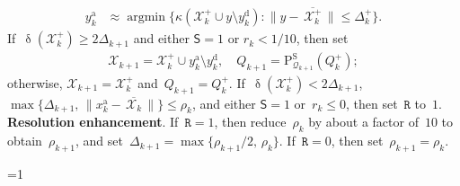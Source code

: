 \documentclass[11pt,a4paper,draft]{article}  %
\newcommand{\bibfile}{\jobname.bib}  %
\newcommand{\iscite}{0}  %
\theoremstyle{definition}
\numberwithin{equation}{section}
\newcommand{\mbar}[1]{\,\overline{\!{#1}\!}\,} %
\newcommand{\xopt}{\mbar}
\DeclareMathOperator{\xdist}{\updelta}
\DeclareMathOperator*{\argmin}{argmin}
\newcommand{\shortd}{\mathsf{S}}
\newcommand{\redrho}{\mathtt{R}}
\newcommand{\Int}{\mathcal{X}}
\newcommand{\Qua}{\mathcal{Q}}
\newcommand{\sss}[1]{{\scriptscriptstyle{#1}}}
\newcommand{\add}{{\textrm{a}}}
\newcommand{\drop}{{\textrm{d}}}
\newcommand{\new}{{\sss{+}}}
\newcommand{\sob}{{\scriptscriptstyle{\textrm{S}}}}
\newcommand{\Projs}{\mathrm{P}^\sob}
\begin{document}
\begin{algorithm}[htbp!]
\begin{algorithmic}[1]
\begin{align}
              \label{eq:yaddn}
              y_k^\add &\approx \argmin\{\kappa(\Int^{\new}_k \cup y \setminus y_k^\drop) \mathrel{:}
              \|y-\xopt{\Int^{\new}_k}\|\le \Delta^{\new}_k\}.
          \end{align}
        If~$\xdist(\Int^\new_k)\ge 2\Delta_{k+1}$ and either $\shortd = 1$ or $r_k < 1/10$, then set
          \begin{align}
            \label{eq:updateq2}
              \Int_{k+1} = \Int^{\new}_k\cup y_k^\add\setminus y_k^\drop,
              \quad
              Q_{k+1} = \Projs_{\Qua_{k+1}}(Q_k^\new) ;
          \end{align}
          otherwise, $\Int_{k+1} = \Int_k^\new$ and~$Q_{k+1} = Q_k^{\new}$.
          If~$\xdist(\Int_k^{\new}) < 2\Delta_{k+1}$, $\max\{\Delta_{k+1},\, \|x_k^\add
          - \xopt{\Int_k}\|\}\le \rho_k$, and either $\shortd=1$ or~$r_k\le 0$,
          then set~$\redrho$ to~$1$.
       \State \textbf{Resolution enhancement}.
       If~$\redrho = 1$, then reduce~$\rho_k$ by about a factor of~$10$ to
       obtain~$\rho_{k+1}$, and set~$\Delta_{k+1} = \max\{\rho_{k+1}/2,\, \rho_k\}$.
       If~$\redrho = 0$, then set~$\rho_{k+1} = \rho_k$.
    \end{algorithmic}
\end{algorithm}


\ifnum\iscite=1
    \small
    
    
\fi

\end{document}
